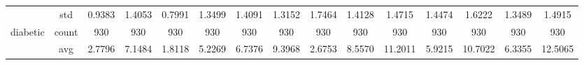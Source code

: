 \begin{table}[H]
{\begin{tabular}{rcccc|c|c|c|c|c|ccccc}
			                                                                               & std                                    & 0.9383                                                                             & 1.4053                                                                    & 0.7991                                                                    & 1.3499                                         & 1.4091                                                                    & 1.3152                                       & 1.7464                                      & 1.4128                                         & 1.4715                                         & 1.4474                                          & 1.6222                                          & 1.3489                                         & 1.4915                                         \\
			diabetic                                                                       & count                                  & 930                                                                                & 930                                                                       & 930                                                                       & 930                                            & 930                                                                       & 930                                          & 930                                         & 930                                            & 930                                            & 930                                             & 930                                             & 930                                            & 930                                            \\
			                                                                               & avg                                    & 2.7796                                                                             & 7.1484                                                                    & \cellcolor[rgb]{ .776,  .937,  .808}\textcolor[rgb]{ 0,  .38,  0}{1.8118} & 5.2269                                         & 6.7376                                                                    & 9.3968                                       & 2.6753                                      & 8.5570                                         & 11.2011                                        & 5.9215                                          & 10.7022                                         & 6.3355                                         & 12.5065                                        \\

\end{tabular}}
\end{table}
